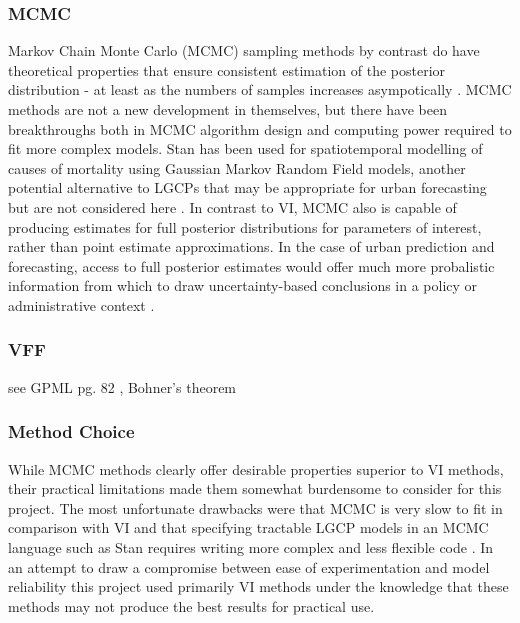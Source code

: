 \documentclass{article}
\begin{document}
\subsubsection{MCMC}

Markov Chain Monte Carlo (MCMC) sampling methods by contrast do have theoretical properties that ensure consistent estimation of the posterior distribution - at least  as the numbers of samples increases asympotically \cite{teng_2017}. MCMC methods are not a new development in themselves, but there have been breakthroughs both in MCMC algorithm design and computing power required to fit more complex models. Stan has been used for spatiotemporal modelling of causes of mortality using Gaussian Markov Random Field models, another potential alternative to LGCPs that may be appropriate for urban forecasting but are not considered here \cite{foreman_2017}. In contrast to VI, MCMC also is capable of producing estimates for full posterior distributions for parameters of interest, rather than point estimate approximations. In the case of urban prediction and forecasting, access to full posterior estimates would offer much more probalistic information from which to draw uncertainty-based conclusions in a policy or administrative context .

\subsubsection{VFF}

see GPML pg. 82 , Bohner's theorem


\subsubsection{Method Choice}

While MCMC methods clearly offer desirable properties superior to VI methods, their practical limitations made them somewhat burdensome to consider for this project. The most unfortunate drawbacks were that MCMC is very slow to fit in comparison with VI and that specifying tractable LGCP models in an MCMC language such as Stan requires writing more complex and less flexible code \cite{Flaxman2015FastHG}. In an attempt to draw a compromise between ease of experimentation and model reliability this project used primarily VI methods under the knowledge that these methods may not produce the best results for practical use.
\end{document}
